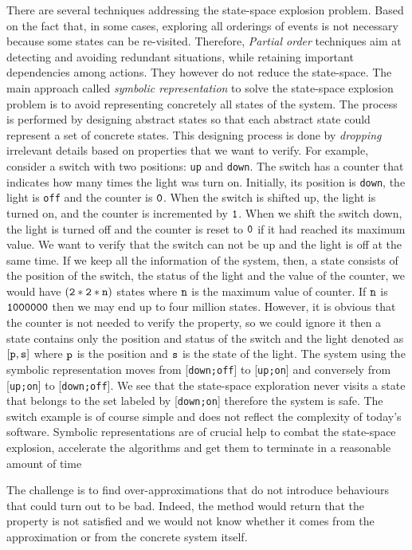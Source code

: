 There are several techniques addressing the state-space explosion problem.
Based on the fact that, in some cases, exploring all orderings of events is not necessary because some states can be re-visited. Therefore, \emph{Partial order} techniques aim at detecting and avoiding
redundant situations, while retaining important dependencies among
actions. They however do not reduce the state-space. The main approach called \emph{symbolic
  representation}  to solve the state-space explosion problem is to avoid representing concretely all states of the system. The process is performed by designing abstract states so that each abstract state could represent a set of concrete states.  This designing process is done by \emph{dropping} irrelevant details based on properties that we want to verify. For example, consider a switch with two positions: {\tt up} and {\tt down}. The switch has a counter that indicates how many times the light was turn on. Initially, its position is {\tt down}, the light is {\tt off} and the counter is $\tt 0$. When the switch is shifted up, the light is turned on, and the counter is incremented by $\tt 1$. When we shift the switch down, the light is turned off and the counter is reset to $\tt 0$ if it had reached its maximum value. We want to verify that the switch can not be up and the light is off at the same time. If we keep all the information of the system, then, a state consists of the position of the switch, the status of the light and the value of the counter, we would have $\tt (2*2*n)$ states where $\tt n$ is the maximum value of counter. If $\tt n$ is $\tt 1000000$ then we may end up to four million states.  However, it is obvious that the counter is not needed to verify the property, so we could ignore it then a state contains only the position and status of the switch and the light denoted as $\tt [p,s]$ where $\tt p$ is the position and $\tt s$ is the state of the light. The system using the symbolic representation moves from  [{\tt down;off}]  to  [{\tt up;on}]  and conversely from  [{\tt up;on}]  to  [{\tt down;off}]. We see that the state-space exploration never visits a state that belongs to the set labeled by  [{\tt down;on}]  therefore the system is safe. The switch example is of course simple and does not reflect the complexity of today’s software. Symbolic representations are of crucial help to combat the state-space explosion, accelerate the algorithms and get them to terminate in a reasonable amount of time

%
The challenge is to find over-approximations that do not introduce
behaviours that could turn out to be bad. Indeed, the method would
return that the property is not satisfied and we would not know
whether it comes from the approximation or from the concrete system
itself. %
                                   
